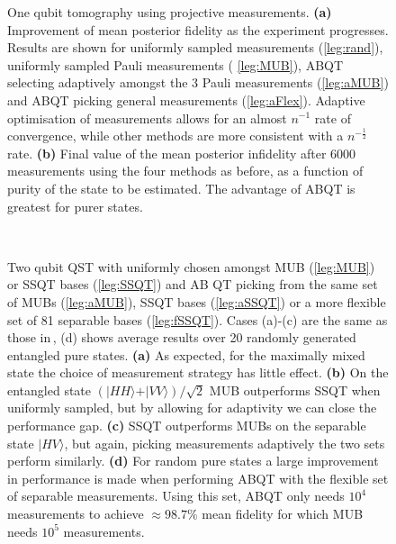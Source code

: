 
\begin{figure}
	
	\caption[Single-qubit adaptive tomography using projective measurements.]{One qubit tomography using projective measurements. \textbf{(a)}  Improvement of mean posterior fidelity as the experiment progresses. Results are shown for uniformly sampled measurements (\ref{leg:rand}), uniformly sampled Pauli measurements ( \ref{leg:MUB}), ABQT selecting adaptively amongst the 3 Pauli measurements (\ref{leg:aMUB}) and ABQT picking general measurements (\ref{leg:aFlex}). Adaptive optimisation of measurements allows for an almost $n^{-1}$ rate of convergence, while other methods are more consistent with a $n^{-\frac{1}{2}}$ rate. \textbf{(b)}  Final value of the mean posterior infidelity after 6000 measurements using the four methods as before, as a function of purity of the state to be estimated. The advantage of ABQT is greatest for purer states. \label{fig:qubit_results}}
\end{figure}

\begin{figure}[th]
	\begin{center}
		
		\\
		
		
	\end{center}
	\caption[Performance of the adaptive Bayesian method in two-qubit tomography]{Two qubit QST with uniformly chosen amongst MUB (\ref{leg:MUB}) or SSQT bases (\ref{leg:SSQT}) and AB QT picking from the same set of MUBs (\ref{leg:aMUB}),  SSQT bases (\ref{leg:aSSQT}) or a more flexible set of 81 separable bases (\ref{leg:fSSQT}). Cases (a)-(c) are the same as those in\,\citep{MUBExperiment}, (d) shows average results over 20 randomly generated entangled pure states. \textbf{(a)} As expected, for the maximally mixed state the choice of measurement strategy has little effect. \textbf{(b)} On the entangled state $(\vert HH\rangle+\vert VV\rangle)/\sqrt{2}$ MUB outperforms SSQT when uniformly sampled, but by allowing for adaptivity we can close the performance gap. \textbf{(c)} SSQT outperforms MUBs on the separable state $\vert HV \rangle$, but again, picking measurements adaptively the two sets perform similarly. \textbf{(d)} For random pure states a large improvement in performance is made when performing ABQT with the flexible set of separable measurements. Using this set, ABQT only needs $10^4$ measurements to achieve $\approx98.7\%$ mean fidelity for which MUB needs $10^5$ measurements. \label{fig:two_qubit_results}}
\end{figure}

